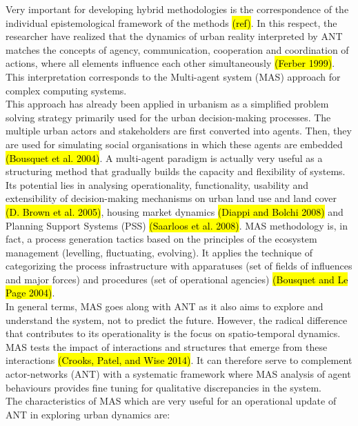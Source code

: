 \documentclass[11pt]{report}
\begin{document}
Very important for developing hybrid methodologies is the correspondence of the individual epistemological framework of the methods \hl{(ref)}. In this respect, the researcher have realized that the dynamics of urban reality interpreted by ANT matches the concepts of agency, communication, cooperation and coordination of actions, where all elements influence each other simultaneously \hl{(Ferber 1999)}.
This interpretation corresponds to the Multi-agent system (MAS) approach for complex computing systems.
\\
This approach has already been applied in urbanism as a simplified problem solving strategy primarily used for the urban decision-making processes. The multiple urban actors and stakeholders are first converted into agents. Then, they are used for simulating social organisations in which these agents are embedded \hl{(Bousquet et al. 2004)}. A multi-agent paradigm is actually very useful as a structuring method that gradually builds the capacity and flexibility of systems.
Its potential lies in analysing  operationality, functionality, usability and extensibility of decision-making mechanisms on urban land use and land cover \hl{(D. Brown et al. 2005)}, housing market dynamics \hl{(Diappi and Bolchi 2008)} and Planning Support Systems (PSS) \hl{(Saarloos et al. 2008)}. MAS methodology is, in fact, a process generation tactics based on the principles of the ecosystem management (levelling, fluctuating, evolving). It applies the technique of categorizing the process infrastructure with apparatuses (set of fields of influences and major forces) and procedures (set of operational agencies) \hl{(Bousquet and Le Page 2004)}.
\\
In general terms, MAS goes along with ANT as it also aims to explore and understand the system, not to predict the future.
However, the radical difference that contributes to its operationality is the focus on spatio-temporal dynamics. MAS tests the impact of interactions and structures that emerge from these interactions \hl{(Crooks, Patel, and Wise 2014)}. It can therefore serve to complement actor-networks (ANT) with a systematic framework where MAS analysis of agent behaviours provides fine tuning for qualitative discrepancies in the system. 
\\
The characteristics of MAS which are very useful for an operational update of ANT in exploring urban dynamics are:
\end{document}
